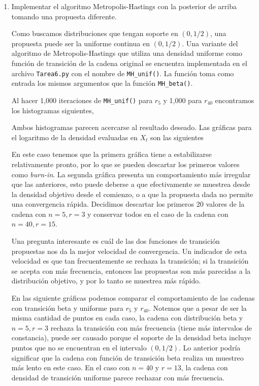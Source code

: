 \documentclass{article}
\begin{document}
\begin{enumerate}
    

    \item  Implementar el algoritmo Metropolis-Hastings con la posterior de arriba
    tomando una propuesta diferente.

    Como buscamos distribuciones que tengan soporte en $(0,1/2)$, una propuesta puede ser la uniforme
    continua en $(0,1/2)$. Una variante del algoritmo de Metropolis-Hastings que utiliza una densidad
    uniforme como función de transición de la cadena original se encuentra implementada en el archivo
    \texttt{Tarea6.py} con el nombre de \texttt{MH\_unif()}. La función toma como entrada los mismos 
    argumentos que la función \texttt{MH\_beta()}.

    Al hacer 1,000 iteraciones de \texttt{MH\_unif()} para $r_5$ y 1,000 para $r_{40}$ encontramos
    los histogramas siguientes,

    \begin{center}
        
        
    \end{center}

    Ambos histogramas parecen acercarse al resultado deseado. Las gráficas para el logaritmo 
    de la densidad evaluadas en $X_t$ son las siguientes

    \begin{center}
        
        
    \end{center}

    En este caso tenemos que la primera gráfica tiene a estabilizarse relativamente pronto, por lo
    que se pueden descartar los primeros valores como \textit{burn-in}. La segunda gráfica presenta
    un comportamiento más irregular que las anteriores, esto puede deberse a que efectivamente se muestrea desde la
    densidad objetivo desde el comienzo, o a que la propuesta dada no permite una convergencia rápida.
    Decidimos descartar los primeros 20 valores de la cadena con $n=5, r = 3$ y conservar todos en el
    caso de la cadena con $n=40, r = 15$.

    Una pregunta interesante es cuál de las dos funciones de transición propuestas nos da la mejor
    velocidad de convergencia. Un indicador de esta velocidad es que tan frecuentemente se rechaza la
    transición; si la transición se acepta con más frecuencia, entonces las propuestas son más parecidas
    a la distribución objetivo, y por lo tanto se muestrea más rápido.

    En las siguiente gráficas podemos comparar el comportamiento de las cadenas con transición beta y
    uniforme para $r_5$ y $r_{40}$. Notemos que a pesar de ser la misma cantidad de puntos en cada caso,
    la cadena con distribución beta y $n=5, r=3$ rechaza la transición con más frecuencia (tiene más intervalos 
    de constancia), puede ser causado porque
    el soporte de la densidad beta incluye puntos que no se encuentran en el intervalo $(0,1/2)$.
    Lo anterior podría significar que la cadena con función de transición beta realiza un muestreo más
    lento en este caso. En el caso con $n=40$ y $r=13$, la cadena con densidad de transición uniforme
    parece rechazar con más frecuencia.


\end{enumerate}
\end{document}
